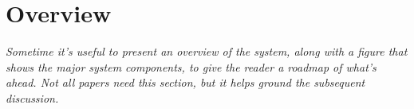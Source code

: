 \section{Overview}
\label{sec:overview}

{\em Sometime it's useful to present an overview of the system, along
  with a figure that shows the major system components, to give the
  reader a roadmap of what's ahead.  Not all papers need this section,
  but it helps ground the subsequent discussion.}

